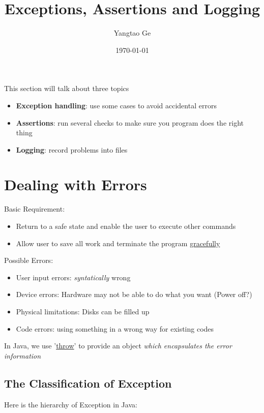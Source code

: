 \documentclass[12pt]{article}
\title{Exceptions, Assertions and Logging}
\author{Yangtao Ge}
\date{\today}
\begin{document}
\maketitle
This section will talk about three topics
\begin{itemize}
    \item \textbf{Exception handling}: use some cases to avoid accidental errors
    \item \textbf{Assertions}: run several checks to make sure you program does the right thing
    \item \textbf{Logging}: record problems into files
\end{itemize}

\section{Dealing with Errors}
Basic Requirement:
\begin{itemize}
    \item Return to a safe state and enable the user to execute other commands
    \item Allow user to save all work and terminate the program \underline{gracefully}
\end{itemize}

Possible Errors:
\begin{itemize}
    \item User input errors: \textit{syntatically} wrong
    \item Device errors: Hardware may not be able to do what you want (Power off?)
    \item Physical limitations: Disks can be filled up 
    \item Code errors: using something in a wrong way for existing codes
\end{itemize}

In Java, we use '\underline{throw}' to provide an object \textit{which encapsulates the error information}

\subsection{The Classification of Exception}
Here is the hierarchy of Exception in Java:\newline
\end{document}
